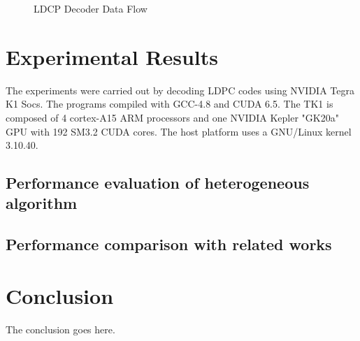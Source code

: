 \documentclass[conference]{IEEEtran}
\begin{document}
\begin{figure}[h]
\begin{centering}
\caption[width=.3\textwidth]{LDCP Decoder Data Flow}
\label{fig_total}
\end{centering}
\end{figure}

\section{Experimental Results} \label{sec4}

The experiments were carried out by decoding LDPC codes using NVIDIA Tegra K1 Socs. The programs compiled with GCC-4.8 and CUDA 6.5. The TK1 is composed of 4 cortex-A15 ARM processors and one NVIDIA Kepler "GK20a" GPU with 192 SM3.2 CUDA cores. The host platform uses a GNU/Linux kernel 3.10.40.

\subsection{Performance evaluation of heterogeneous algorithm} 


\subsection{Performance comparison with related works}


\section{Conclusion}
The conclusion goes here.

\newpage






\end{document}
